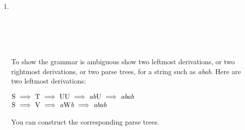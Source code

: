 \documentclass[11pt]{article}
\begin{document}
\begin{enumerate}
\begin{multicols}{2}
\begin{enumerate}
              \item \begin{grammar}
                        \\
                        \\
                        \\
                        \\
                    \end{grammar}

            \end{enumerate}

          \end{multicols}

          \enlargethispage{4mm}

    \item \hspace{1mm}%
          \begin{grammar}
              \\
              \\
              \\
              \\
              \\
          \end{grammar}

          \smallskip

          To show the grammar is ambiguous show two leftmost derivations, or
          two rightmost derivations, or two parse trees, for a string such
          as {\em abab}.  Here are two leftmost derivations:

          \(
            \begin{array}[t]{@{}l}
            \mathrm{S \ \Longrightarrow\ T \ \Longrightarrow\ UU \
                    \Longrightarrow
                    \  \mathit{ab}U \ \Longrightarrow\  \mathit{abab}}
              \\
            \mathrm{S \ \Longrightarrow\ V \ \Longrightarrow\
                    \mathit{a}W\mathit{b} \
                    \Longrightarrow \ \mathit{abab}}
                \\
            \end{array}
          \)

          You can construct the corresponding parse trees.

  \end{enumerate}
\end{document}
